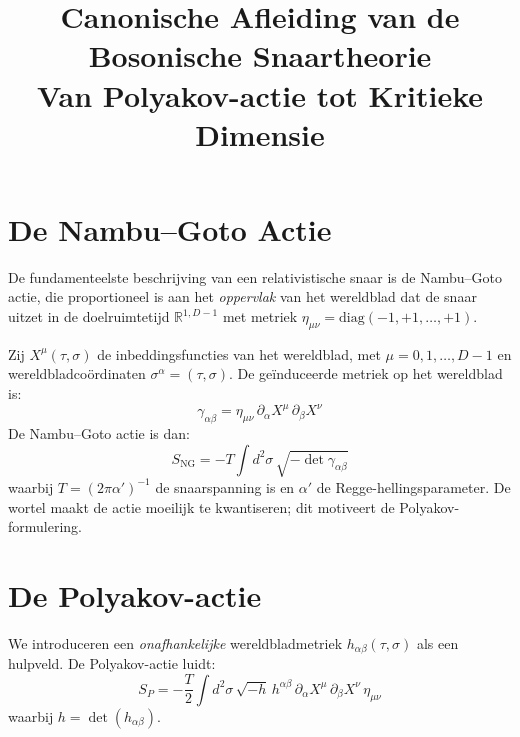 \documentclass[12pt,a4paper]{article}
\title{\textbf{Canonische Afleiding van de Bosonische Snaartheorie}\\
\large Van Polyakov-actie tot Kritieke Dimensie}
\author{}
\date{}
\begin{document}
    \maketitle
    \tableofcontents
    \newpage

    \section{De Nambu--Goto Actie}

        De fundamenteelste beschrijving van een relativistische snaar is de Nambu--Goto actie, die proportioneel is aan het \emph{oppervlak} van het wereldblad dat de snaar uitzet in de doelruimtetijd $\mathbb{R}^{1,D-1}$ met metriek $\eta_{\mu\nu} = \mathrm{diag}(-1,+1,\dots,+1)$.

        Zij $X^\mu(\tau,\sigma)$ de inbeddingsfuncties van het wereldblad, met $\mu = 0,1,\dots,D-1$ en wereldbladco\"ordinaten $\sigma^\alpha = (\tau,\sigma)$. De ge\"induceerde metriek op het wereldblad is:
        \begin{equation}
            \gamma_{\alpha\beta} = \eta_{\mu\nu}\,\partial_\alpha X^\mu\,\partial_\beta X^\nu
        \end{equation}
        De Nambu--Goto actie is dan:
        \begin{equation}
            S_{\mathrm{NG}} = -T \int d^2\sigma\,\sqrt{-\det\gamma_{\alpha\beta}}
            \label{eq:NG}
        \end{equation}
        waarbij $T = (2\pi\alpha')^{-1}$ de snaarspanning is en $\alpha'$ de Regge-hellingsparameter. De wortel maakt de actie moeilijk te kwantiseren; dit motiveert de Polyakov-formulering.

    \section{De Polyakov-actie}

        We introduceren een \emph{onafhankelijke} wereldbladmetriek $h_{\alpha\beta}(\tau,\sigma)$ als een hulpveld. De Polyakov-actie luidt:
        \begin{equation}
            S_P = -\frac{T}{2}\int d^2\sigma\,\sqrt{-h}\,h^{\alpha\beta}\,\partial_\alpha X^\mu\,\partial_\beta X^\nu\,\eta_{\mu\nu}
            \label{eq:Polyakov}
        \end{equation}
        waarbij $h = \det(h_{\alpha\beta})$.
\end{document}
